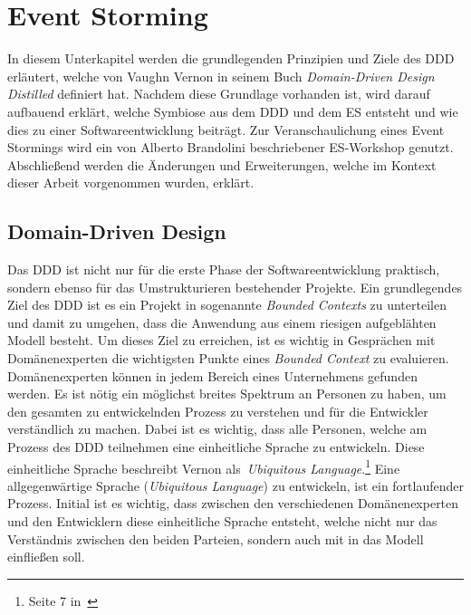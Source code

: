 \section{Event Storming}\label{sec:event-storming}
In diesem Unterkapitel werden die grundlegenden Prinzipien und Ziele des \ac{DDD} erläutert, welche von Vaughn Vernon in seinem Buch
\textit{Domain-Driven Design Distilled} definiert hat.\cite*{dddd}
Nachdem diese Grundlage vorhanden ist, wird darauf aufbauend erklärt, welche Symbiose aus dem \ac{DDD} und dem \ac{ES} entsteht und wie
dies zu einer Softwareentwicklung beiträgt.
Zur Veranschaulichung eines Event Stormings wird ein von Alberto Brandolini beschriebener \ac{ES}-Workshop genutzt.
Abschließend werden die Änderungen und Erweiterungen, welche im Kontext dieser Arbeit vorgenommen wurden, erklärt.

\subsection{Domain-Driven Design}\label{subsec:domain-driven-design}
Das \ac*{DDD} ist nicht nur für die erste Phase der Softwareentwicklung praktisch, sondern ebenso für das Umstrukturieren bestehender Projekte.
Ein grundlegendes Ziel des \ac{DDD} ist es ein Projekt in sogenannte \textit{Bounded Contexts} zu unterteilen und damit zu umgehen, dass
die Anwendung aus einem riesigen aufgeblähten Modell besteht.
Um dieses Ziel zu erreichen, ist es wichtig in Gesprächen mit Domänenexperten die wichtigsten Punkte eines \textit{Bounded Context} zu evaluieren.
Domänenexperten können in jedem Bereich eines Unternehmens gefunden werden.
Es ist nötig ein möglichst breites Spektrum an Personen zu haben, um den gesamten zu entwickelnden Prozess zu verstehen und für die Entwickler verständlich zu machen.
Dabei ist es wichtig, dass alle Personen, welche am Prozess des \ac{DDD} teilnehmen eine einheitliche Sprache zu entwickeln.
Diese einheitliche Sprache beschreibt Vernon als~\textit{Ubiquitous Language}.\footnote{Seite 7 in~\cite*{dddd}}
Eine allgegenwärtige Sprache (\textit{Ubiquitous Language}) zu entwickeln, ist ein fortlaufender Prozess.
Initial ist es wichtig, dass zwischen den verschiedenen Domänenexperten und den Entwicklern diese einheitliche Sprache entsteht, welche
nicht nur das Verständnis zwischen den beiden Parteien, sondern auch mit in das Modell einfließen soll.

